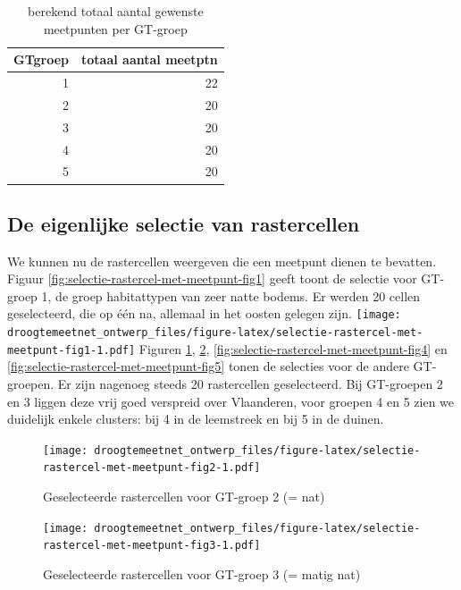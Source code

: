 \documentclass[11pt,]{book}
\begin{document}
\begin{table}

\caption{\label{tab:overzicht-perGT-gewenst-aantal-meetpunten}berekend totaal aantal gewenste meetpunten per GT-groep}
\centering
\begin{tabular}[t]{r|r}
\hline
GTgroep & totaal aantal meetptn\\
\hline
1 & 22\\
\hline
2 & 20\\
\hline
3 & 20\\
\hline
4 & 20\\
\hline
5 & 20\\
\hline
\end{tabular}
\end{table}

\subsection{De eigenlijke selectie van
rastercellen}\label{de-eigenlijke-selectie-van-rastercellen}

We kunnen nu de rastercellen weergeven die een meetpunt dienen te
bevatten. Figuur \ref{fig:selectie-rastercel-met-meetpunt-fig1} geeft
toont de selectie voor GT-groep 1, de groep habitattypen van zeer natte
bodems. Er werden 20 cellen geselecteerd, die op één na, allemaal in het
oosten gelegen zijn.
\texttt{[image: droogtemeetnet\_ontwerp\_files/figure-latex/selectie-rastercel-met-meetpunt-fig1-1.pdf]}
Figuren \ref{fig:selectie-rastercel-met-meetpunt-fig2},
\ref{fig:selectie-rastercel-met-meetpunt-fig3},
\ref{fig:selectie-rastercel-met-meetpunt-fig4} en
\ref{fig:selectie-rastercel-met-meetpunt-fig5} tonen de selecties voor
de andere GT-groepen. Er zijn nagenoeg steeds 20 rastercellen
geselecteerd. Bij GT-groepen 2 en 3 liggen deze vrij goed verspreid over
Vlaanderen, voor groepen 4 en 5 zien we duidelijk enkele clusters: bij 4
in de leemstreek en bij 5 in de duinen.

\begin{figure}
\centering
\texttt{[image: droogtemeetnet\_ontwerp\_files/figure-latex/selectie-rastercel-met-meetpunt-fig2-1.pdf]}
\caption{\label{fig:selectie-rastercel-met-meetpunt-fig2}Geselecteerde
rastercellen voor GT-groep 2 (= nat)}
\end{figure}

\begin{figure}
\centering
\texttt{[image: droogtemeetnet\_ontwerp\_files/figure-latex/selectie-rastercel-met-meetpunt-fig3-1.pdf]}
\caption{\label{fig:selectie-rastercel-met-meetpunt-fig3}Geselecteerde
rastercellen voor GT-groep 3 (= matig nat)}
\end{figure}
\end{document}
